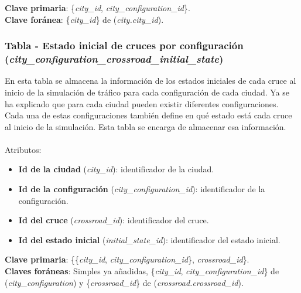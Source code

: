 \textbf{Clave primaria}: \{\textit{city\_id}, \textit{city\_configuration\_id}\}. \\
\textbf{Clave foránea}: \{\textit{city\_id}\} de (\textit{city.city\_id}).

\subsubsection{Tabla - Estado inicial de cruces por configuración\\ (\textit{city\_configuration\_crossroad\_initial\_state})}
En esta tabla se almacena la información de los estados iniciales de cada cruce al inicio de la simulación de tráfico para cada configuración de cada ciudad. Ya se ha explicado que para cada ciudad pueden existir diferentes configuraciones. Cada una de estas configuraciones también define en qué estado está cada cruce al inicio de la simulación. Esta tabla se encarga de almacenar esa información. \\\\
Atributos:
\begin{itemize}
    \item \textbf{Id de la ciudad} (\textit{city\_id}): identificador de la ciudad.
    \item \textbf{Id de la configuración} (\textit{city\_configuration\_id}): identificador de la configuración.
    \item \textbf{Id del cruce} (\textit{crossroad\_id}): identificador del cruce.
    \item \textbf{Id del estado inicial} (\textit{initial\_state\_id}): identificador del estado inicial.
\end{itemize}
\textbf{Clave primaria}: \{\{\textit{city\_id}, \textit{city\_configuration\_id}\}, \textit{crossroad\_id}\}. \\
\textbf{Claves foráneas}: Simples ya añadidas, \{\textit{city\_id}, \textit{city\_configuration\_id}\} \newline de (\textit{city\_configuration}) y \{\textit{crossroad\_id}\} de (\textit{crossroad.crossroad\_id}).

